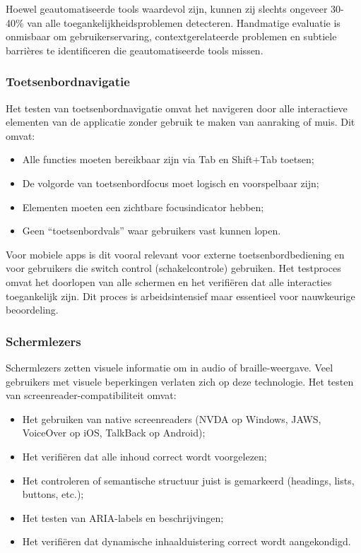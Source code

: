 Hoewel geautomatiseerde tools waardevol zijn, kunnen zij slechts ongeveer 30-40\% van alle toegankelijkheidsproblemen detecteren. Handmatige evaluatie is onmisbaar om gebruikerservaring, contextgerelateerde problemen en subtiele barrières te identificeren die geautomatiseerde tools missen. \autocite{Teran2021}

\subsubsection{Toetsenbordnavigatie}

Het testen van toetsenbordnavigatie omvat het navigeren door alle interactieve elementen van de applicatie zonder gebruik te maken van aanraking of muis. Dit omvat:

\begin{itemize}
    \item Alle functies moeten bereikbaar zijn via Tab en Shift+Tab toetsen;
    \item De volgorde van toetsenbordfocus moet logisch en voorspelbaar zijn;
    \item Elementen moeten een zichtbare focusindicator hebben;
    \item Geen ``toetsenbordvals'' waar gebruikers vast kunnen lopen.
\end{itemize}

Voor mobiele apps is dit vooral relevant voor externe toetsenbordbediening en voor gebruikers die switch control (schakelcontrole) gebruiken. Het testproces omvat het doorlopen van alle schermen en het verifiëren dat alle interacties toegankelijk zijn. Dit proces is arbeidsintensief maar essentieel voor nauwkeurige beoordeling.

\subsubsection{Schermlezers}

Schermlezers zetten visuele informatie om in audio of braille-weergave. Veel gebruikers met visuele beperkingen verlaten zich op deze technologie. Het testen van screenreader-compatibiliteit omvat:

\begin{itemize}
    \item Het gebruiken van native screenreaders (NVDA op Windows, JAWS, VoiceOver op iOS, TalkBack op Android);
    \item Het verifiëren dat alle inhoud correct wordt voorgelezen;
    \item Het controleren of semantische structuur juist is gemarkeerd (headings, lists, buttons, etc.);
    \item Het testen van ARIA-labels en beschrijvingen;
    \item Het verifiëren dat dynamische inhaalduistering correct wordt aangekondigd.
\end{itemize}

